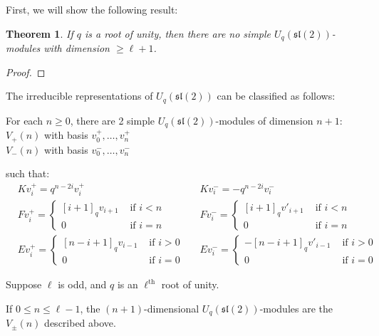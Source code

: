 \documentclass[]{article}
\newtheorem{theorem}{Theorem}[subsection]
\newcommand{\sll}{\mathfrak{sl}}
\numberwithin{equation}{subsection}
\begin{document}
First, we will show the following result:

\begin{theorem}
If $q$ is a root of unity, then there are no simple $U_q(\sll(2))$-modules
with dimension $\geq \ell+1$. 
\end{theorem}

\begin{proof}
\end{proof}

The irreducible representations of
$U_q(\sll(2))$ can be classified as follows: 

For each $n\geq 0$, there are 2 simple $U_q(\sll(2))$-modules of dimension $n+1$: 
$V_+(n)$ with basis $v^+_0, \ldots, v^+_n$ \\
$V_-(n)$ with basis $v^-_0, \ldots, v^-_n$

such that: 
\begin{align*}
    &K v^+_i = q^{n-2i} v^+_i  &
    &K v^-_i = -q^{n-2i} v^-_i \\
    &F v^+_i = \begin{cases} [i+1]_qv_{i+1}& \text{ if $i < n$} \\ 0& \text{ if $i = n$} \end{cases} &
    &F v^-_i = \begin{cases} [i+1]_qv'_{i+1}& \text{ if $i < n$} \\ 0& \text{ if $i = n$} \end{cases} \\
    &E v^+_i = \begin{cases} 
                     [n-i+1]_qv_{i-1}& \text{ if $i > 0$} \\ 
                    0& \text{ if $i = 0$} 
             \end{cases} &
    &E v^-_i = \begin{cases} 
                    -[n-i+1]_q v'_{i-1}& \text{ if $i > 0$} \\ 
                    0& \text{ if $i = 0$} 
             \end{cases}
\end{align*}


Suppose $\ell$ is odd, and $q$ is an $\ell^{\text{th}}$ root of unity. 

If $0 \leq n \leq \ell - 1$, the $(n+1)$-dimensional
$U_q(\sll(2))$-modules are the $V_{\pm}(n)$ described above. 
\end{document}

